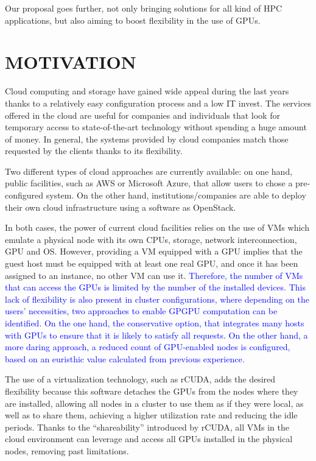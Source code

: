 \documentclass[a4paper,twoside]{article}
\begin{document}
Our proposal goes further, not only bringing solutions for all kind of HPC applications, 
but also aiming to boost flexibility in the use of GPUs.

\section{\uppercase{Motivation}}
\label{sec:motivation}

Cloud computing and storage have gained wide appeal  
during the last years thanks to a relatively easy configuration  
process and a low IT invest. The services offered in the cloud are useful for companies and individuals 
that look for temporary access to state-of-the-art technology without spending a 
huge amount of money. In general, the systems provided by cloud 
companies match those requested by the clients thanks to its flexibility.

Two different types of cloud approaches are currently available:
on one hand, public facilities, such as AWS or 
Microsoft Azure, that allow users to chose a pre-configured system.   
On the other hand, institutions/companies 
are able to deploy their own cloud infrastructure using a software as OpenStack.  

In both cases, the power of current cloud facilities relies on the use 
of VMs which  
emulate a physical node with its own 
CPUs, storage, network interconnection, GPU and OS. 
However, providing a VM equipped with a GPU implies
that the guest host must be equipped with at least one real GPU, and
once it has been assigned to an instance, no other VM can use
it. 
\textcolor{blue}{Therefore, the number of VMs that can access the GPUs is 
limited by the number of the installed devices. 
This lack of 
flexibility is also present in cluster configurations, where 
depending on the users' necessities, 
two approaches to enable GPGPU computation can be identified.
On the one hand, the conservative option, that integrates many hosts with GPUs to ensure that it is likely to satisfy all requests.
On the other hand, a more daring approach, a reduced count of GPU-enabled nodes is configured, based on an euristhic value calculated from previous experience.
}

The use of a virtualization technology, such as {rCUDA}, adds 
the desired flexibility because this software detaches the GPUs 
from the nodes where they are installed, allowing all nodes in a cluster
to use them as if they were local, as well as to share them, 
achieving a higher utilization rate and reducing the idle periods.
Thanks to the ``shareability'' introduced by {rCUDA}, all VMs in the cloud 
environment can leverage and access all GPUs installed in 
the physical nodes, removing past limitations. 
\end{document}
